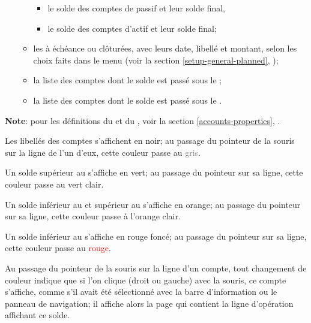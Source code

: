 \begin{itemize}
\begin{itemize}
\begin{itemize}[label=-]
					\item le solde des comptes de passif et leur solde final,
					\item le solde des comptes d'actif et leur solde final;
				\end{itemize}
			\item les  à échéance ou clôturées, avec leurs date, libellé et montant, selon les choix faits dans le menu  (voir la section \vref{setup-general-planned}, );
			\item la liste des comptes dont le solde est passé sous le ;
			\item la liste des comptes dont le solde est passé sous le .
	\end{itemize}
\end{itemize}


\textbf{Note}: pour les définitions du  et du , voir la section \vref{accounts-properties}, .


Les libellés des comptes s'affichent en \textcolor{black}{noir}; au passage du pointeur de la souris sur la ligne de l'un d'eux, cette couleur passe au \textcolor{gray}{gris}.

Un solde supérieur au  s'affiche en \textcolor[RGB]{0,126,0}{vert}; au passage du pointeur sur sa ligne, cette couleur passe au \textcolor[RGB]{0,227,0}{vert clair}.

Un solde inférieur au  et supérieur au  s'affiche en \textcolor[RGB]{230,155,0}{orange}; au passage du pointeur sur sa ligne, cette couleur passe à l'\textcolor[RGB]{255,200,0}{orange clair}.

Un solde inférieur au  s'affiche en \textcolor[RGB]{153,0,0}{rouge foncé}; au passage du pointeur sur sa ligne, cette couleur passe au \textcolor{red}{rouge}.

Au passage du pointeur de la souris sur la ligne d'un compte, tout changement de couleur indique que si l'on clique (droit ou gauche) avec la souris, ce compte s'affiche, comme s'il avait été sélectionné avec la barre d'information ou le panneau de navigation; il affiche alors la page qui contient la ligne d'opération affichant ce solde.

